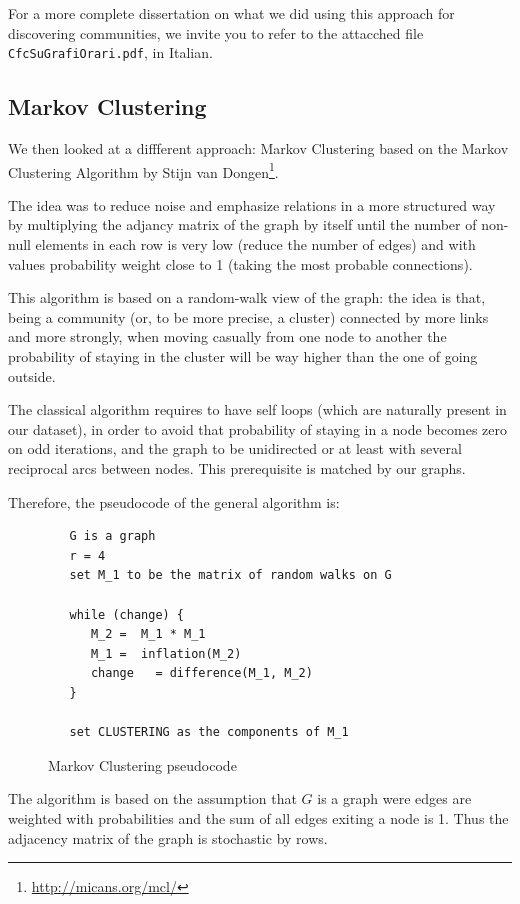 \documentclass[12pt,a4paper]{article}
\begin{document}
For a more complete dissertation on what we did using this approach for discovering communities, we invite you to refer to the attacched file \texttt{CfcSuGrafiOrari.pdf}, in Italian.

\subsection{Markov Clustering}

We then looked at a diffferent approach: Markov Clustering based on the Markov Clustering Algorithm by Stijn van Dongen\footnote{\url{http://micans.org/mcl/}}.

The idea was to reduce noise and emphasize relations in a more structured way
by multiplying the adjancy matrix of the graph by itself until the number of
non-null elements in each row is very low (reduce the number of edges) and with
values probability weight close to 1 (taking the most probable connections).

This algorithm is based on a random-walk view of the graph: the idea is that, being a community
(or, to be more precise, a cluster) connected by more links and more strongly, when moving
casually from one node to another the probability of staying in the cluster
will be way higher than the one of going outside. 

The classical algorithm requires to have self loops (which are naturally present in our dataset), in order to avoid that probability of staying in a node becomes zero on odd iterations, and the graph to be unidirected or at least with several reciprocal arcs between nodes.
This prerequisite is matched by our graphs.

Therefore, the pseudocode of the general algorithm is:
\begin{figure}
\begin{verbatim}
   G is a graph
   r = 4
   set M_1 to be the matrix of random walks on G

   while (change) {
      M_2 =  M_1 * M_1
      M_1 =  inflation(M_2)
      change   = difference(M_1, M_2)
   }

   set CLUSTERING as the components of M_1
\end{verbatim}
\caption{Markov Clustering pseudocode}
\end{figure}

The algorithm is based on the assumption that $G$ is a graph
were edges are weighted with probabilities and the sum
of all edges exiting a node is 1. Thus the adjacency matrix
of the graph is stochastic by rows.
\end{document}
